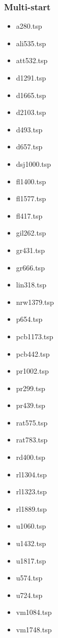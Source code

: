 \subsubsection{Multi-start}\label{construction_perf}
\begin{center}
\begin{multicols}{4}
\begin{itemize}
\item{a280.tsp}
\item{ali535.tsp}
\item{att532.tsp}
\item{d1291.tsp}
\item{d1665.tsp}
\item{d2103.tsp}
\item{d493.tsp}
\item{d657.tsp}
\item{dsj1000.tsp}
\item{fl1400.tsp}
\item{fl1577.tsp}
\item{fl417.tsp}
\item{gil262.tsp}
\item{gr431.tsp}
\item{gr666.tsp}
\item{lin318.tsp}
\item{nrw1379.tsp}
\item{p654.tsp}
\item{pcb1173.tsp}
\item{pcb442.tsp}
\item{pr1002.tsp}
\item{pr299.tsp}
\item{pr439.tsp}
\item{rat575.tsp}
\item{rat783.tsp}
\item{rd400.tsp}
\item{rl1304.tsp}
\item{rl1323.tsp}
\item{rl1889.tsp}
\item{u1060.tsp}
\item{u1432.tsp}
\item{u1817.tsp}
\item{u574.tsp}
\item{u724.tsp}
\item{vm1084.tsp}
\item{vm1748.tsp}
\end{itemize}
\end{multicols}
\end{center}

